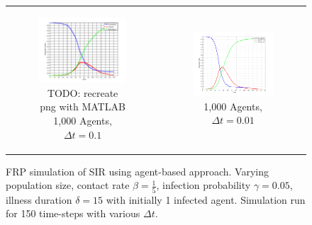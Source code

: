\begin{figure}
\begin{center}
\begin{tabular}{c c}
    	\\
    	
		\begin{subfigure}[b]{0.3\textwidth}
			\centering
			\includegraphics[width=1\textwidth, angle=0]{./fig/step2_yampa/SIR_1000agents_150t_01dt.png}
			\caption{TODO: recreate png with MATLAB 1,000 Agents, $\Delta t = 0.1$}
			\label{fig:sir_abs_approximating_01dt_1000agents}
		\end{subfigure}
		& 
		\begin{subfigure}[b]{0.3\textwidth}
			\centering
			\includegraphics[width=1\textwidth, angle=0]{./fig/step2_yampa/SIR_1000agents_150t_001dt.png}
			\caption{1,000 Agents, $\Delta t = 0.01$}
			\label{fig:sir_abs_approximating_001dt_1000agents}
		\end{subfigure}
	\end{tabular}
	
	\caption{FRP simulation of SIR using agent-based approach. Varying population size, contact rate $\beta = \frac{1}{5}$, infection probability $\gamma = 0.05$, illness duration $\delta = 15$ with initially 1 infected agent. Simulation run for 150 time-steps with various $\Delta t$.} 
	\label{fig:sir_abs_dynamics_frp}
\end{center}
\end{figure}

